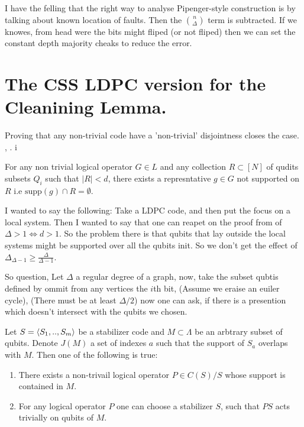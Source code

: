 \documentclass[manuscript,screen,review]{acmart}
\begin{document}
{ I have the felling that the right way to analyse Pipenger-style construction is by talking about known location of faults. Then the ${ n \choose \Delta }$ term is subtracted. If we knowes, from head were the bits might fliped (or not fliped) then we can set the constant depth majority cheaks to reduce the error.   



  \section{The CSS LDPC version for the Cleanining Lemma.}

 Proving that any non-trivial code have a 'non-trivial' disjointness closes the case. \cite{Jochym_O_Connor_2018}, \cite{bostanci2021findingdisjointnessstabilizercodes}. 
i

\begin{lemma} For any non trivial logical operator $G \in L$ and any collection $R \subset [N]$ of qudits subsets $Q_i$ such that $|R| < d$, there exists a represntative $g \in G$ not supported on $R$ i.e $\text{supp}(g) \cap R = \emptyset$. 
\end{lemma}

I wanted to say the following: Take a LDPC code, and then put the focus on a local system. Then I wanted to say that one can reapet on the proof from \cite{Jochym_O_Connor_2018} of $ \Delta > 1 \Leftrightarrow d > 1$. So the problem there is that qubits that lay outside the local systems might be supported over all the qubits init. So we don't get the effect of $\Delta_{\Delta-1} \ge \frac{\Delta}{\Delta - 1} $. 

So question, Let $\Delta$ a regular degree of a graph, now, take the subset qubtis defined by ommit from any vertices the $i$th bit, (Assume we eraise an euiler cycle), (There must be at least $\Delta /2$) now one can ask, if there is a presention which doesn't intersect with the qubits we chosen.

\begin{lemma}
  \label{lemma:cleaning}
  Let $S = \braket{S_1,..,S_{m}}$ be a stabilizer code and $M\subset \Lambda$ be an arbtrary subset of qubits. Denote $J(M)$ a set of indexes $a$ such that the support of $S_{a}$ overlaps with $M$. Then one of the following is true: 
  \begin{enumerate}
    \item There exists a non-trivail logical operator $P \in C(S)/S$ whose support is contained in $M$. 
    \item For any logical operator $P$ one can choose a stabilizer $S$, such that $PS$ acts trivially on qubits of $M$. 
  \end{enumerate}



\end{lemma}}
\end{document}
